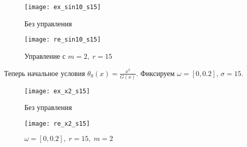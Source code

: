 \begin{figure}[H]
\centering
\begin{minipage}{.5\textwidth}
  \centering
  \texttt{[image: ex\_sin10\_s15]}
  \caption{Без управления}
  \label{fig:test1}
\end{minipage}%
\begin{minipage}{.5\textwidth}
  \centering
  \texttt{[image: re\_sin10\_s15]}
  \caption{Управление с $m = 2, \; r = 15$}
  \label{fig:test2}
\end{minipage}
\end{figure}


\begin{exmp_bur}
\end{exmp_bur}
Теперь начальное условия $\theta_0(x) = \frac{x^2}{G(x)}$. Фиксируем $\omega = [0, 0.2]$, $\sigma = 15$. 

\begin{figure}[H]
\centering
\begin{minipage}{.5\textwidth}
  \centering
  \texttt{[image: ex\_x2\_s15]}
  \caption{Без управления}
  \label{fig:test1}
\end{minipage}%
\begin{minipage}{.5\textwidth}
  \centering
  \texttt{[image: re\_x2\_s15]}
  \caption{$\omega = [0, 0.2], \; r = 15, \; m = 2$}
  \label{fig:test2}
\end{minipage}
\end{figure}

